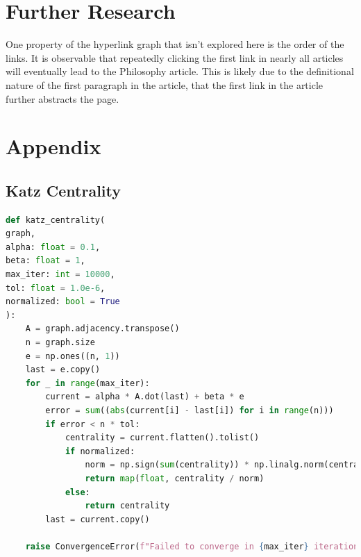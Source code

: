 \documentclass{article}
\begin{document}
\section{Further Research}

One property of the hyperlink graph that isn't explored here is the order of the links. It is observable that repeatedly clicking the first link in nearly all articles will eventually lead to the Philosophy article. This is likely due to the definitional nature of the first paragraph in the article, that the first link in the article further abstracts the page.




\section{Appendix}


\subsection{Katz Centrality}
\linespread{1}
\begin{lstlisting}[language=Python]
def katz_centrality(
graph,
alpha: float = 0.1,
beta: float = 1,
max_iter: int = 10000,
tol: float = 1.0e-6,
normalized: bool = True
):
    A = graph.adjacency.transpose()
    n = graph.size
    e = np.ones((n, 1))
    last = e.copy()
    for _ in range(max_iter):
        current = alpha * A.dot(last) + beta * e
        error = sum((abs(current[i] - last[i]) for i in range(n)))
        if error < n * tol:
            centrality = current.flatten().tolist()
            if normalized:
                norm = np.sign(sum(centrality)) * np.linalg.norm(centrality)
                return map(float, centrality / norm)
            else:
                return centrality
        last = current.copy()

    raise ConvergenceError(f"Failed to converge in {max_iter} iterations.")
\end{lstlisting}
\end{document}
